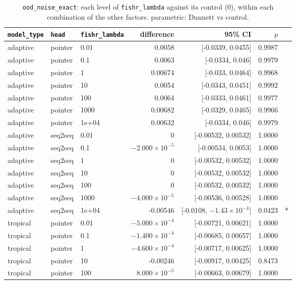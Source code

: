 \documentclass[10pt]{article}
\begin{document}
{\small
\begin{longtable}{lllrrrl}
\caption{\texttt{ood\_noise\_exact}: each level of \texttt{fishr\_lambda} against its control (0), within each combination of the other factors. parametric: Dunnett vs control.}\label{tab:control-ood_noise_exact}\\
\toprule
\texttt{model\_type} & \texttt{head} & \texttt{fishr\_lambda} & difference & 95\% CI & $p$ & \\
\midrule
\endhead
adaptive & pointer & 0.01 & 0.0058 & [-0.0339, 0.0455] & 0.9987 & \\
adaptive & pointer & 0.1 & 0.0063 & [-0.0334, 0.046] & 0.9979 & \\
adaptive & pointer & 1 & 0.00674 & [-0.033, 0.0464] & 0.9968 & \\
adaptive & pointer & 10 & 0.0054 & [-0.0343, 0.0451] & 0.9992 & \\
adaptive & pointer & 100 & 0.0064 & [-0.0333, 0.0461] & 0.9977 & \\
adaptive & pointer & 1000 & 0.00682 & [-0.0329, 0.0465] & 0.9966 & \\
adaptive & pointer & 1e+04 & 0.00632 & [-0.0334, 0.046] & 0.9979 & \\
adaptive & seq2seq & 0.01 & 0 & [-0.00532, 0.00532] & 1.0000 & \\
adaptive & seq2seq & 0.1 & $-2.000\times10^{-5}$ & [-0.00534, 0.0053] & 1.0000 & \\
adaptive & seq2seq & 1 & 0 & [-0.00532, 0.00532] & 1.0000 & \\
adaptive & seq2seq & 10 & 0 & [-0.00532, 0.00532] & 1.0000 & \\
adaptive & seq2seq & 100 & 0 & [-0.00532, 0.00532] & 1.0000 & \\
adaptive & seq2seq & 1000 & $-4.000\times10^{-5}$ & [-0.00536, 0.00528] & 1.0000 & \\
adaptive & seq2seq & 1e+04 & -0.00546 & [-0.0108, $-1.43\times10^{-4}$] & 0.0423 & *\\
tropical & pointer & 0.01 & $-5.000\times10^{-4}$ & [-0.00721, 0.00621] & 1.0000 & \\
tropical & pointer & 0.1 & $-1.400\times10^{-4}$ & [-0.00685, 0.00657] & 1.0000 & \\
tropical & pointer & 1 & $-4.600\times10^{-4}$ & [-0.00717, 0.00625] & 1.0000 & \\
tropical & pointer & 10 & -0.00246 & [-0.00917, 0.00425] & 0.8473 & \\
tropical & pointer & 100 & $8.000\times10^{-5}$ & [-0.00663, 0.00679] & 1.0000 & \\

\end{longtable}}
\end{document}
